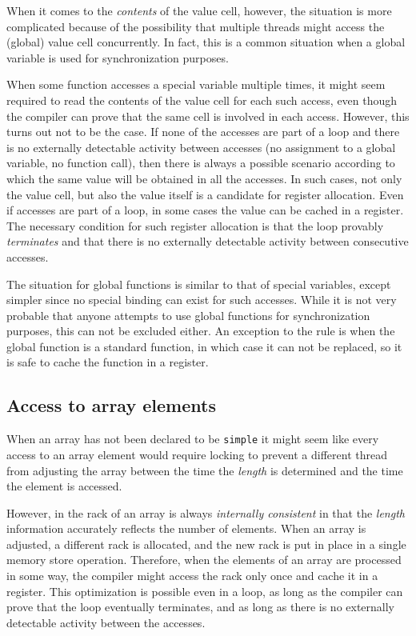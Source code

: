 When it comes to the \emph{contents} of the value cell, however, the
situation is more complicated because of the possibility that multiple
threads might access the (global) value cell concurrently.  In fact,
this is a common situation when a global variable is used for
synchronization purposes.

When some function accesses a special variable multiple times, it
might seem required to read the contents of the value cell for each
such access, even though the compiler can prove that the same cell is
involved in each access.  However, this turns out not to be the case.
If none of the accesses are part of a loop and there is no externally
detectable activity between accesses (no assignment to a global
variable, no function call), then there is always a possible scenario
according to which the same value will be obtained in all the
accesses.  In such cases, not only the value cell, but also the value
itself is a candidate for register allocation.  Even if accesses are
part of a loop, in some cases the value can be cached in a register.
The necessary condition for such register allocation is that the loop
provably \emph{terminates} and that there is no externally detectable
activity between consecutive accesses.

The situation for global functions is similar to that of special
variables, except simpler since no special binding can exist for such
accesses.  While it is not very probable that anyone attempts to use
global functions for synchronization purposes, this can not be
excluded either.  An exception to the rule is when the global function
is a standard \commonlisp{} function, in which case it can not be replaced, so
it is safe to cache the function in a register.

\subsection{Access to array elements}

When an array has not been declared to be \texttt{simple} it might
seem like every access to an array element would require locking to
prevent a different thread from adjusting the array between the time
the \emph{length} is determined and the time the element is accessed.

However, in \sysname{} the rack of an array is always
\emph{internally consistent} in that the \emph{length} information
accurately reflects the number of elements.  When an array is
adjusted, a different rack is allocated, and the new
rack is put in place in a single memory store operation.
Therefore, when the elements of an array are processed in some way,
the compiler might access the rack only once and cache it
in a register.  This optimization is possible even in a loop, as long
as the compiler can prove that the loop eventually terminates, and as
long as there is no externally detectable activity between the
accesses.


